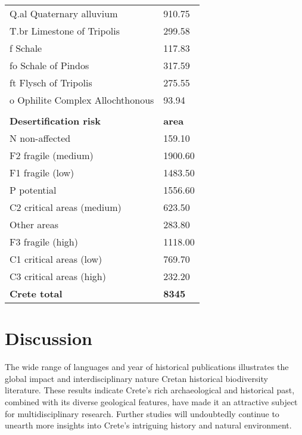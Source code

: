\begin{longtable}{ll}
Q.al Quaternary alluvium                           & 910.75           \\
T.br  Limestone of Tripolis                        & 299.58           \\
f Schale                                           & 117.83           \\
fo Schale of Pindos                                & 317.59           \\
ft Flysch of Tripolis                              & 275.55           \\
o Ophilite Complex Allochthonous                   & 93.94            \\
                                                   &                  \\
\textbf{Desertification risk}                      & \textbf{area}    \\
N non-affected                                     & 159.10           \\
F2 fragile (medium)                                & 1900.60          \\
F1 fragile (low)                                   & 1483.50          \\
P potential                                        & 1556.60          \\
C2 critical areas (medium)                         & 623.50           \\
Other areas                                        & 283.80           \\
F3 fragile (high)                                  & 1118.00          \\
C1 critical areas (low)                            & 769.70           \\
C3 critical areas (high)                           & 232.20           \\
\textbf{Crete total}                               & \textbf{8345}




\end{longtable}


\section{Discussion}\label{crete_idea_discussion}

The wide range of languages and year of historical publications illustrates the
global impact and interdisciplinary nature Cretan historical biodiversity literature.
These results indicate Crete's rich archaeological and historical past,
combined with its diverse geological features, have made it an attractive subject
for multidisciplinary research. Further studies will undoubtedly continue to
unearth more insights into Crete's intriguing history and natural environment.

